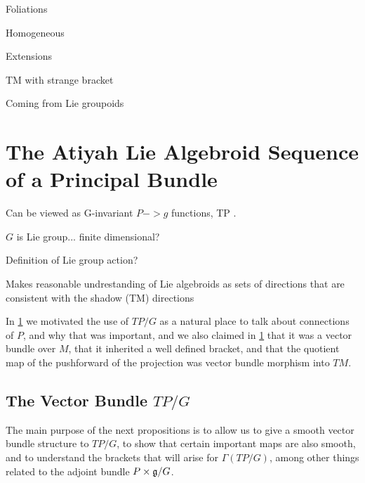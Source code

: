Foliations

Homogeneous

Extensions

TM with strange bracket

Coming from Lie groupoids

\section{The Atiyah Lie Algebroid Sequence of a Principal Bundle}

Can be viewed as G-invariant $P-> g$ functions, TP .

$G$ is Lie group... finite dimensional?

Definition of Lie group action?

Makes reasonable undrestanding of Lie algebroids as sets of directions that are consistent with the shadow (TM) directions

In \ref{} we motivated the use of $TP/G$ as a natural place to talk about connections of $P$, and why that was important, and we also claimed in \ref{} that it was a vector bundle over $M$, that it inherited a well defined bracket, and that the quotient map of the pushforward of the projection was vector bundle morphism into $TM$.

\subsection*{The Vector Bundle $TP/G$}

The main purpose of the next propositions is to allow us to give a smooth vector bundle structure to $TP/G$, to show that certain important maps are also smooth, and to understand the brackets that will arise for $\Gamma(TP/G)$, among other things related to the adjoint bundle $P\times \mathfrak{g}/G$.


